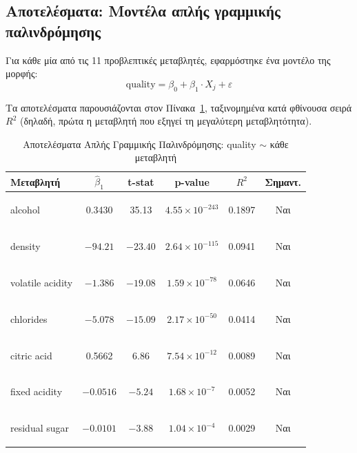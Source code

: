 \documentclass[12pt,a4paper]{article}
\begin{document}
\subsection{Αποτελέσματα: Μοντέλα απλής γραμμικής παλινδρόμησης}

Για κάθε μία από τις 11 προβλεπτικές μεταβλητές, εφαρμόστηκε ένα μοντέλο της μορφής:
$$\text{quality} = \beta_0 + \beta_1 \cdot X_j + \varepsilon$$

Τα αποτελέσματα παρουσιάζονται στον Πίνακα~\ref{tab:simple_regression}, ταξινομημένα κατά φθίνουσα σειρά $R^2$ (δηλαδή, πρώτα η μεταβλητή που εξηγεί τη μεγαλύτερη μεταβλητότητα).

\begin{table}[H]
\centering
\caption{Αποτελέσματα Απλής Γραμμικής Παλινδρόμησης: quality $\sim$ κάθε μεταβλητή}
\label{tab:simple_regression}
\small
\begin{tabular}{lccccc}
\toprule
\textbf{Μεταβλητή} & $\hat{\beta}_1$ & \textbf{t-stat} & \textbf{p-value} & $R^2$ & \textbf{Σημαντ.} \\
\midrule
\begin{english}alcohol\end{english} & 0.3430 & 35.13 & $4.55 \times 10^{-243}$ & 0.1897 & Ναι \\
\begin{english}density\end{english} & $-94.21$ & $-23.40$ & $2.64 \times 10^{-115}$ & 0.0941 & Ναι \\
\begin{english}volatile acidity\end{english} & $-1.386$ & $-19.08$ & $1.59 \times 10^{-78}$ & 0.0646 & Ναι \\
\begin{english}chlorides\end{english} & $-5.078$ & $-15.09$ & $2.17 \times 10^{-50}$ & 0.0414 & Ναι \\
\begin{english}citric acid\end{english} & 0.5662 & 6.86 & $7.54 \times 10^{-12}$ & 0.0089 & Ναι \\
\begin{english}fixed acidity\end{english} & $-0.0516$ & $-5.24$ & $1.68 \times 10^{-7}$ & 0.0052 & Ναι \\
\begin{english}residual sugar\end{english} & $-0.0101$ & $-3.88$ & $1.04 \times 10^{-4}$ & 0.0029 & Ναι \\

\end{tabular}
\end{table}
\end{document}
